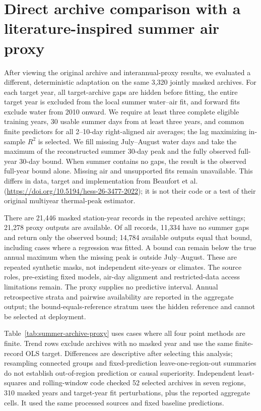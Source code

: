 \section{Direct archive comparison with a literature-inspired summer air proxy}
After viewing the original archive and interannual-proxy results, we evaluated a different, deterministic adaptation on the same 3,320 jointly masked archives. For each target year, all target-archive gaps are hidden before fitting, the entire target year is excluded from the local summer water--air fit, and forward fits exclude water from 2010 onward. We require at least three complete eligible training years, 30 usable summer days from at least three years, and common finite predictors for all 2--10-day right-aligned air averages; the lag maximizing in-sample $R^2$ is selected. We fill missing July--August water days and take the maximum of the reconstructed summer 30-day peak and the fully observed full-year 30-day bound. When summer contains no gaps, the result is the observed full-year bound alone. Missing air and unsupported fits remain unavailable. This differs in data, target and implementation from Beaufort et al. (\url{https://doi.org/10.5194/hess-26-3477-2022}); it is not their code or a test of their original multiyear thermal-peak estimator.

There are 21,446 masked station-year records in the repeated archive settings; 21,278 proxy outputs are available. Of all records, 11,334 have no summer gaps and return only the observed bound; 14,784 available outputs equal that bound, including cases where a regression was fitted. A bound can remain below the true annual maximum when the missing peak is outside July--August. These are repeated synthetic masks, not independent site-years or climates. The source roles, pre-existing fixed models, air-day alignment and restricted-data access limitations remain. The proxy supplies no predictive interval. Annual retrospective strata and pairwise availability are reported in the aggregate output; the bound-equals-reference stratum uses the hidden reference and cannot be selected at deployment.

Table~\ref{tab:summer-archive-proxy} uses cases where all four point methods are finite. Trend rows exclude archives with no masked year and use the same finite-record OLS target. Differences are descriptive after selecting this analysis; resampling connected groups and fixed-prediction leave-one-region-out summaries do not establish out-of-region prediction or causal superiority. Independent least-squares and rolling-window code checked 52 selected archives in seven regions, 310 masked years and target-year fit perturbations, plus the reported aggregate cells. It used the same processed sources and fixed baseline predictions.

